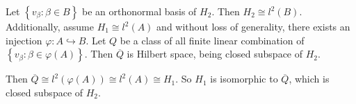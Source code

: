 \begin{problem}[8]
	\hfill

	Let $\left\{ v_\beta : \beta \in B \right\} $ be an orthonormal basis of $H_2$. Then $H_2 \cong l^2(B)$. Additionally, assume $H_1 \cong l^2(A)$ and without loss of generality, there exists an injection $\varphi : A \hookrightarrow B$. Let $Q$ be a class of all finite linear combination of $\left\{ v_\beta : \beta \in \varphi\left( A \right) \right\}$. Then $\overline{Q}$ is Hilbert space, being closed subspace of $H_2$. 

	Then $\overline{Q} \cong l^2\left( \varphi\left( A \right) \right) \cong l^2\left( A \right) \cong H_1$. So $H_1$ is isomorphic to $\overline{Q}$, which is closed subspace of $H_2$. 
	
\end{problem}

